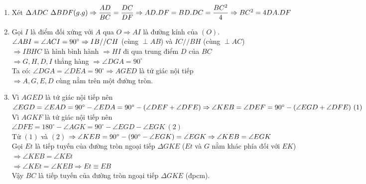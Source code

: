 \begin{ex}
{\begin{center}
\begin{tikzpicture}[scale=0.9]
    \end{tikzpicture}
    \end{center}
    \begin{enumerate}
         \item Xét $\Delta ADC~\Delta BDF (g.g) \Rightarrow \dfrac{AD}{BC}=\dfrac{DC}{DF}\\
         \Rightarrow AD.DF=BD.DC=\dfrac{BC^2}{4}\\
         \Rightarrow BC^2=4DA.DF$
         \item Gọi $I$ là điểm đối xứng với $A$ qua $O \Rightarrow AI$ là đường kính của $(O)$.\\
         $\angle ABI=\angle ACI= 90^{\circ}\\
         \Rightarrow IB//CH$ (cùng $\perp AB$) và $IC//BH$ (cùng $\perp AC$)\\
         $\Rightarrow IBHC$ là hình bình hành $\Rightarrow HI$ đi qua trung điểm $D$ của $BC$\\
         $\Rightarrow G,H,D,I$ thẳng hàng
         $\Rightarrow \angle DGA = 90^{\circ}$\\
         Ta có: $\angle DGA = \angle DEA = 90^{\circ} \Rightarrow AGED$ là tứ giác nội tiếp \\
         $\Rightarrow A,G,E,D$ cùng nằm trên một đường tròn.
         \item Vì $AGED$ là tứ giác nội tiếp nên\\
         $\angle EGD= \angle EAD= 90^{\circ}-\angle EDA=90^{\circ}-(\angle DEF +\angle DFE)\\
         \Rightarrow \angle KEB = \angle DEF = 90^{\circ}-(\angle EGD +\angle DFE)~(1)$\\
         Vì $AGKF$ là tứ giác nội tiếp nên \\$\angle DFE= 180^{\circ}-\angle AGK=90^{\circ}-\angle EGD -\angle EGK ~(2)$\\
         Từ $(1)$ và $(2)$ $\Rightarrow \angle KEB =90^{\circ}-(90^{\circ}-\angle EGK) = \angle EGK\\
         \Rightarrow \angle KEB=\angle EGK$\\
         Gọi $Et$ là tiếp tuyến của đường tròn ngoại tiếp $\Delta GKE$ ($Et$ và $G$ nằm khác phía đối với $EK$)\\
         $\Rightarrow \angle KEB=\angle KEt $\\
         $\Rightarrow \angle KEt = \angle KEB \Rightarrow Et \equiv EB $\\
         Vậy $BC$ là tiếp tuyến của đường tròn ngoại tiếp $\Delta GKE$ (đpcm).
    \end{enumerate}
    }
\end{ex}

